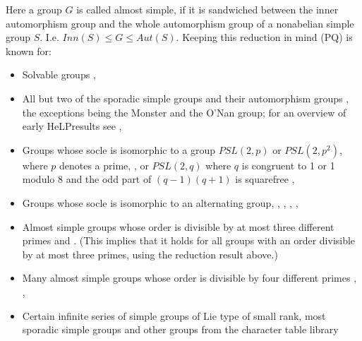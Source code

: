 \documentclass[a4paper,11pt]{report}
\begin{document}
{{ Here a group $G$ is called almost simple, if it is sandwiched between the inner automorphism
group and the whole automorphism group of a non\texttt{}abelian
simple group $S$. I.e. $Inn(S) \leq G \leq Aut(S).$ Keeping this reduction in mind (PQ) is known for: 
\begin{itemize}
\item  Solvable groups \cite{KimmiPQ}, 
\item  All but two of the sporadic simple groups and their automorphism groups \cite{CaMaBrauerTree}, the exceptions being the Monster and the O'Nan group; for an overview of
early HeLP\texttt{}results see \cite{KonovalovKimmiStAndrews}, 
\item  Groups whose socle is isomorphic to a group $PSL(2,p)$ or $PSL(2,p^2)$, where $p$ denotes a prime, \cite{HertweckBrauer}, \cite{BaMa4prI} or $PSL(2,q)$ where $q$ is congruent to 1 or \texttt{}1 modulo 8 and the odd part of $(q-1)(q+1)$ is squarefree \cite{EiseleMargolisMod4}, 
\item  Groups whose socle is isomorphic to an alternating group, \cite{SalimA7A8}, \cite{SalimA9A10}, \cite{BaCa}, \cite{BaMaAn}, 
\item  Almost simple groups whose order is divisible by at most three different
primes \cite{KonovalovKimmiStAndrews} and \cite{BaMaM10}. (This implies that it holds for all groups with an order divisible by at
most three primes, using the reduction result above.) 
\item  Many almost simple groups whose order is divisible by four different primes \cite{BaMa4prI}, \cite{BaMa4prII}, \cite{EiseleMargolisMod4} 
\item  Certain infinite series of simple groups of Lie type of small rank, most
sporadic simple groups and other groups from the character table library \cite{CaMaBrauerTree} 
\end{itemize}
 }

 }

   
\end{document}
